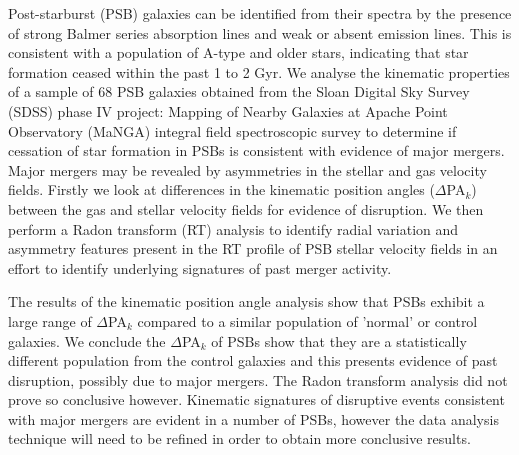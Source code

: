 
Post-starburst (PSB) galaxies can be identified from their spectra by the presence of strong Balmer series absorption lines and weak or absent emission lines. This is consistent with a population of A-type and older stars, indicating that star formation ceased within the past 1 to 2 Gyr. We analyse the kinematic properties of a sample of 68 PSB galaxies obtained from the Sloan Digital Sky Survey (SDSS) phase IV project: Mapping of Nearby Galaxies at Apache Point Observatory (MaNGA) integral field spectroscopic survey to determine if cessation of star formation in PSBs is consistent with evidence of major mergers. Major mergers may be revealed by asymmetries in the stellar and gas velocity fields. Firstly we look at differences in the kinematic position angles ($\Delta$PA$_{k}$) between the gas and stellar velocity fields for evidence of disruption. We then perform a Radon transform (RT) analysis to identify radial variation and asymmetry features present in the RT profile of PSB stellar velocity fields in an effort to identify underlying signatures of past merger activity.

The results of the kinematic position angle analysis show that PSBs exhibit a large range of $\Delta$PA$_{k}$ compared to a similar population of 'normal' or control galaxies. We conclude the $\Delta$PA$_{k}$ of PSBs show that they are a statistically different population from the control galaxies and this presents evidence of past disruption, possibly due to major mergers. The Radon transform analysis did not prove so conclusive however. Kinematic signatures of disruptive events consistent with major mergers are evident in a number of PSBs, however the data analysis technique will need to be refined in order to obtain more conclusive results. 


